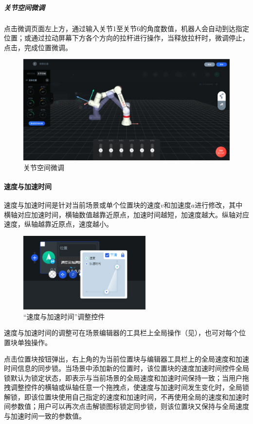 \subparagraph{关节空间微调}
点击微调页面左上方，通过输入关节1至关节6的角度数值，机器人会自动到达指定位置；或通过拉动屏幕下方各个方向的拉杆进行操作，当释放拉杆时，微调停止，点击，完成位置微调。

\begin{figure}[ht]
	\centering
	\includegraphics[width=\textwidth]{screen/3-10.png}
	\caption{关节空间微调}
	\label{fig:关节空间微调}
\end{figure}

\paragraph{速度与加速时间}
速度与加速时间是针对当前场景或单个位置块的速度$v$和加速度$a$进行修改，其中横轴对应加速时间，横轴数值越靠近原点，加速时间越短，加速度越大。纵轴对应速度，纵轴越靠近原点，速度越小。

\begin{figure}[ht]
	\centering
	\includegraphics[height=4cm]{screen/3-11.png}
	\caption{“速度与加速时间”调整控件}
	\label{fig:速度与加速时间}
\end{figure}

速度与加速时间的调整可在场景编辑器的工具栏上全局操作（见），也可对每个位置块单独操作。

点击位置块按钮弹出，右上角的为当前位置块与编辑器工具栏上的全局速度和加速时间信息的同步锁。当场景中添加新的位置时，该位置块的速度加速时间控件全局锁默认为锁定状态，即表示与当前场景的全局速度和加速时间保持一致；当用户拖拽调整控件的横轴或纵轴任意一个拖拽点，使速度与加速时间发生变化时，全局锁解锁，即该位置块使用自己指定的速度和加速时间，不再使用全局的速度和加速时间参数值；用户可以再次点击解锁图标锁定同步锁，则该位置块又保持与全局速度与加速时间一致的参数值。

